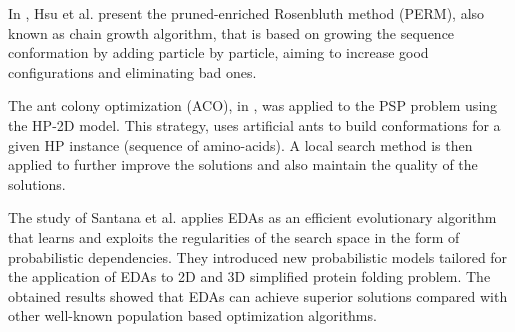 \documentclass[conference]{IEEEtran}
\begin{document}






In \cite{hsu2003growth}, Hsu et al. present the  pruned-enriched Rosenbluth method (PERM), also known as chain growth algorithm, that is based on growing the sequence conformation by adding particle by particle, aiming to increase good configurations and eliminating bad ones.


The ant colony optimization (ACO), in \cite{shmygelska2002ant, shmygelska2003improved}, was applied to the PSP problem using the HP-2D model. This strategy, uses artificial ants to build conformations for a given HP instance (sequence of amino-acids). A local search method is then applied to further improve the solutions and also maintain the quality of the solutions.

The study of Santana et al. \cite{santana2008component} applies EDAs as an efficient evolutionary algorithm that learns and exploits the regularities of the search space in the form of probabilistic dependencies. They introduced new probabilistic models tailored for the application of EDAs to 2D and 3D simplified protein folding problem. The obtained results showed that EDAs can achieve superior solutions compared with other well-known population based optimization algorithms.




\end{document}
